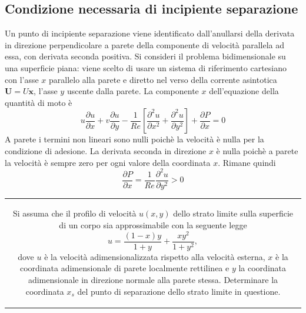 \subsection{Condizione necessaria di incipiente separazione}
Un punto di incipiente separazione viene identificato dall'anullarsi
 della derivata in direzione perpendicolare a parete della componente
 di velocità parallela ad essa, con derivata seconda positiva.
Si consideri il problema bidimensionale su una superficie piana: viene
 scelto di usare un sistema di riferimento cartesiano con l'asse $x$
 parallelo alla parete e diretto nel verso della corrente asintotica
 $\bm{U} = U \bm{x}$, l'asse $y$ uscente dalla parete.
La componente $x$ dell'equazione della quantità di moto è
 \begin{equation}
  u \dfrac{\partial u}{\partial x} +
  v \dfrac{\partial u}{\partial y} -
  \dfrac{1}{Re}\left[ \dfrac{\partial^2 u}{\partial x^2} +
                      \dfrac{\partial^2 u}{\partial y^2} \right] +
  \dfrac{\partial P}{\partial x} = 0
 \end{equation}
A parete i termini non lineari sono nulli poichè la velocità è nulla per
 la condizione di adesione. La derivata seconda in direzione $x$ è nulla
 poichè a parete la velocità è sempre zero per ogni valore della coordinata 
 $x$. Rimane quindi
 \begin{equation}
  \dfrac{\partial P}{\partial x} =
    \dfrac{1}{Re}\dfrac{\partial^2 u}{\partial y^2} > 0
 \end{equation}
 


\noindent
\begin{tabular}{c}
\begin{minipage}[b]{0.95\textwidth}
\begin{exerciseS}
Si assuma che il profilo di velocit\`{a} $u(x,y)$ dello strato limite sulla superficie di un corpo
sia approssimabile con la seguente legge
$$
 u = \frac{(1-x)y}{1+y} + \frac{xy^2}{1+y^2},
$$
dove $u$ \`{e} la velocit\`{a} adimensionalizzata rispetto alla velocit\`{a} esterna, $x$ \`{e} la 
coordinata adimensionale di parete localmente rettilinea e $y$ la coordinata adimensionale in direzione
normale alla parete stessa. Determinare la coordinata $x_s$ del punto di separazione dello strato limite
in questione.
\end{exerciseS}
\end{minipage}
\end{tabular}


\sol

